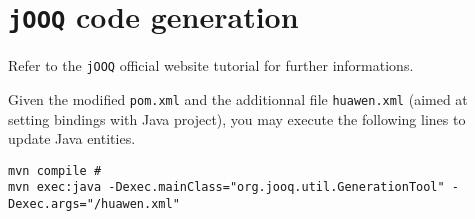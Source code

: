 \section{\texttt{jOOQ} code generation}

Refer to the \texttt{jOOQ} official website tutorial for further informations.

Given the modified \texttt{pom.xml} and the additionnal file \texttt{huawen.xml} (aimed at setting bindings with Java project), you may execute the following lines to update Java entities.

\begin{lstlisting}
mvn compile #
mvn exec:java -Dexec.mainClass="org.jooq.util.GenerationTool" -Dexec.args="/huawen.xml"
\end{lstlisting}
